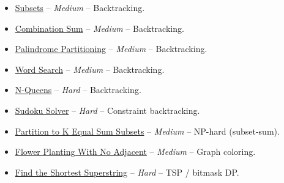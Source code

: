 \documentclass[11pt]{article}
\begin{document}
\begin{itemize}
  \item \href{https://leetcode.com/problems/subsets/}{Subsets} -- \emph{Medium} -- Backtracking.
  \item \href{https://leetcode.com/problems/combination-sum/}{Combination Sum} -- \emph{Medium} -- Backtracking.
  \item \href{https://leetcode.com/problems/palindrome-partitioning/}{Palindrome Partitioning} -- \emph{Medium} -- Backtracking.
  \item \href{https://leetcode.com/problems/word-search/}{Word Search} -- \emph{Medium} -- Backtracking.
  \item \href{https://leetcode.com/problems/n-queens/}{N-Queens} -- \emph{Hard} -- Backtracking.
  \item \href{https://leetcode.com/problems/sudoku-solver/}{Sudoku Solver} -- \emph{Hard} -- Constraint backtracking.
  \item \href{https://leetcode.com/problems/partition-to-k-equal-sum-subsets/}{Partition to K Equal Sum Subsets} -- \emph{Medium} -- NP-hard (subset-sum).
  \item \href{https://leetcode.com/problems/flower-planting-with-no-adjacent/}{Flower Planting With No Adjacent} -- \emph{Medium} -- Graph coloring.
  \item \href{https://leetcode.com/problems/find-the-shortest-superstring/}{Find the Shortest Superstring} -- \emph{Hard} -- TSP / bitmask DP.
\end{itemize}
\end{document}
